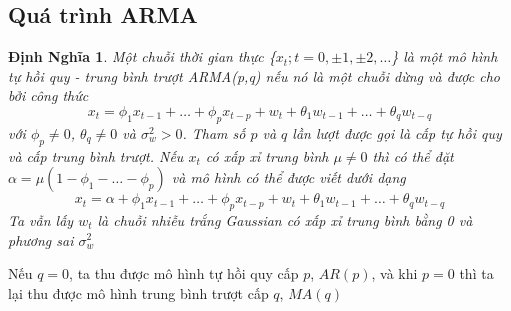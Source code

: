 \documentclass[twoside,12pt]{Latex/Classes/PhDthesisPSnPDF}
\newtheorem{defi}{Định Nghĩa}[chapter]
\begin{document}
 
\subsection{Quá trình ARMA}
\begin{defi}
Một chuỗi thời gian thực \{$x_t; t=0,\pm1,\pm2,\dots$\} là một mô hình tự hồi quy - trung bình trượt ARMA(p,q) nếu nó là một chuỗi dừng và được cho bởi công thức
\begin{equation}\label{equa:arma}
	x_t = \phi_1x_{t-1}+\dots+\phi_px_{t-p}+w_t+\theta_1w_{t-1}+\dots+\theta_qw_{t-q}
\end{equation}
với $\phi_p \neq 0$, $\theta_q \neq 0$ và $\sigma_{w}^{2} > 0$. Tham số $p$ và $q$ lần lượt được gọi là cấp tự hồi quy và cấp trung bình trượt. Nếu $x_t$ có xấp xỉ trung bình $\mu \neq 0$ thì có thể đặt $\alpha = \mu(1-\phi_1-\dots-\phi_p)$ và mô hình có thể được viết dưới dạng
\begin{equation}
  x_t = \alpha + \phi_1x_{t-1}+\dots+\phi_px_{t-p}+w_t+\theta_1w_{t-1}+\dots+\theta_qw_{t-q}
\end{equation}
Ta vẫn lấy $w_t$ là chuỗi nhiễu trắng Gaussian có xấp xỉ trung bình bằng 0 và phương sai $\sigma_{w}^{2}$
\end{defi}
Nếu $q = 0$, ta thu được mô hình tự hồi quy cấp $p$, $AR(p)$, và khi $p = 0$ thì ta lại thu được mô hình trung bình trượt cấp $q$, $MA(q)$
\end{document}
